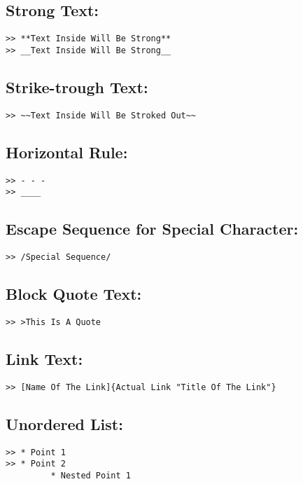 \documentclass[british]{article}
\begin{document}
\subsection{Strong Text:}
\begin{verbatim}
>> **Text Inside Will Be Strong**
>> __Text Inside Will Be Strong__
\end{verbatim}

\subsection{Strike-trough Text:}
\begin{verbatim}
>> ~~Text Inside Will Be Stroked Out~~
\end{verbatim}

\subsection{Horizontal Rule:}
\begin{verbatim}
>> - - -
>> ____
\end{verbatim}

\subsection{Escape Sequence for Special Character:}
\begin{verbatim}
>> /Special Sequence/
\end{verbatim}

\subsection{Block Quote Text:}
\begin{verbatim}
>> >This Is A Quote
\end{verbatim}

\subsection{Link Text:}
\begin{verbatim}
>> [Name Of The Link]{Actual Link "Title Of The Link"}
\end{verbatim}

\subsection{Unordered List:}
\begin{verbatim}
>> * Point 1
>> * Point 2
         * Nested Point 1
\end{verbatim}
\end{document}
